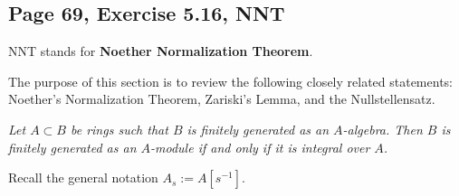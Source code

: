 \documentclass[parskip=half,fontsize=12pt]{scrartcl}%
\begin{document}
\subsection{Page 69, Exercise 5.16, NNT}\label{nnt}%

NNT stands for \textbf{Noether Normalization Theorem}.

The purpose of this section is to review the following closely related statements: Noether's Normalization Theorem, Zariski's Lemma, %
and the Nullstellensatz.

\emph{Let $A\subset B$ be rings such that $B$ is finitely generated as an $A$-algebra. Then $B$ is finitely generated as an $A$-module if and only if it is integral over $A$.}

Recall the general notation $A_s:=A[s^{-1}]$.%
\end{document}
